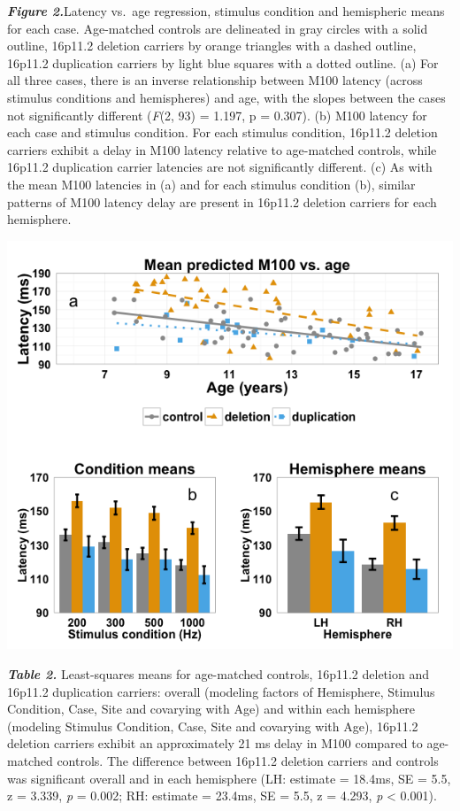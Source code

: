 \documentclass[]{article}
\begin{document}
\textbf{\emph{Figure 2.}}Latency vs.~age regression, stimulus condition
and hemispheric means for each case. Age-matched controls are delineated
in gray circles with a solid outline, 16p11.2 deletion carriers by
orange triangles with a dashed outline, 16p11.2 duplication carriers by
light blue squares with a dotted outline. (a) For all three cases, there
is an inverse relationship between M100 latency (across stimulus
conditions and hemispheres) and age, with the slopes between the cases
not significantly different (\emph{F}(2, 93) = 1.197, p = 0.307). (b)
M100 latency for each case and stimulus condition. For each stimulus
condition, 16p11.2 deletion carriers exhibit a delay in M100 latency
relative to age-matched controls, while 16p11.2 duplication carrier
latencies are not significantly different. (c) As with the mean M100
latencies in (a) and for each stimulus condition (b), similar patterns
of M100 latency delay are present in 16p11.2 deletion carriers for each
hemisphere.

\includegraphics{figure-2-resubmssion.png}

\textbf{\emph{Table 2.}} Least-squares means for age-matched controls,
16p11.2 deletion and 16p11.2 duplication carriers: overall (modeling
factors of Hemisphere, Stimulus Condition, Case, Site and covarying with
Age) and within each hemisphere (modeling Stimulus Condition, Case, Site
and covarying with Age), 16p11.2 deletion carriers exhibit an
approximately 21 ms delay in M100 compared to age-matched controls. The
difference between 16p11.2 deletion carriers and controls was
significant overall and in each hemisphere (LH: estimate = 18.4ms, SE =
5.5, z = 3.339, \emph{p} = 0.002; RH: estimate = 23.4ms, SE = 5.5, z =
4.293, \emph{p} \textless{} 0.001).
\end{document}
